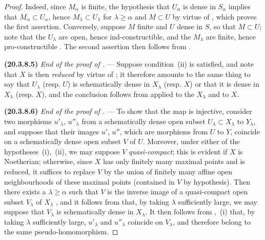 \begin{proof}
Indeed, since $M_\alpha$ is finite, the hypothesis that $U_\alpha$ is dense in $S_\alpha$ implies that
$M_\alpha\subset U_\alpha$, hence $M_\lambda\subset U_\lambda$ for $\lambda\geq\alpha$ and $M\subset U$ by virtue of , which proves the first assertion.
Conversely, suppose $M$ finite and $U$ dense in $S$, so that $M\subset U$; note that the $U_\lambda$ are open, hence ind-constructible, and the $M_\lambda$ are finite, hence pro-constructible .
The second assertion then follows from .

\textbf{(20.3.8.5)} \emph{End of the proof of .} ---
Suppose condition~(ii) is satisfied, and note that $X$ is then \emph{reduced} by virtue of ; it therefore amounts to the same thing to say that $U_\lambda$ (resp. $U$) is schematically dense in $X_\lambda$ (resp. $X$) or that it is dense in $X_\lambda$ (resp. $X$), and the conclusion follows from  applied to the $X_\lambda$ and to $X$.

\textbf{(20.3.8.6)} \emph{End of the proof of .} ---
To show that the map  is injective, consider two morphisms $u'_\lambda$, $u''_\lambda$ from a schematically dense open subset $U_\lambda\subset X_\lambda$ to $Y_\lambda$, and suppose that their images $u'$, $u''$, which are morphisms from $U$ to $Y$, coincide on a schematically dense open subset $V$ of $U$.
Moreover, under either of the hypotheses~(i),~(ii), we may suppose $V$ \emph{quasi-compact}; this is evident if $X$ is Noetherian; otherwise, since $X$ has only finitely many maximal points and is reduced, it suffices to replace $V$ by the union of finitely many affine open neighbourhoods of these maximal points (contained in $V$ by hypothesis).
Then there exists a $\lambda\geq\alpha$ such that $V$ is the inverse image of a quasi-compact open subset $V_\lambda$ of $X_\lambda$ , and it follows from  that, by taking $\lambda$ sufficiently large, we may suppose that $V_\lambda$ is schematically dense in $X_\lambda$.
It then follows from ,~(i) that, by taking $\lambda$ sufficiently large, $u'_\lambda$ and $u''_\lambda$ coincide on $V_\lambda$, and therefore belong to the same pseudo-homomorphism.


\end{proof}
